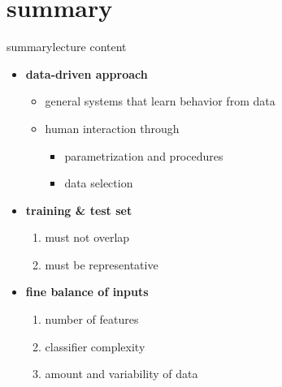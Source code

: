     \section{summary}
        \begin{frame}{summary}{lecture content}
            \begin{itemize}
                \item   \textbf{data-driven approach}
                    \begin{itemize}
                        \item   general systems that learn behavior from data
                        \item   human interaction through
                            \begin{itemize}
                                \item   parametrization and procedures
                                \item   data selection
                            \end{itemize}
                    \end{itemize}
                \bigskip
                \item   \textbf{training \& test set}
                    \begin{enumerate}
                        \item   must not overlap
                        \item   must be representative
                    \end{enumerate}
                \bigskip
                \item   \textbf{fine balance of inputs}
                    \begin{enumerate}
                        \item   number of features
                        \item   classifier complexity
                        \item   amount and variability of data
                    \end{enumerate}
            \end{itemize}
        \end{frame}

